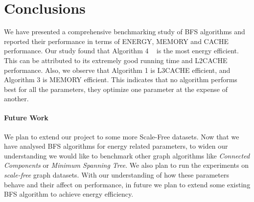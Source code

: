 \section{Conclusions}
\label{conc}

%
%
%

We have presented a comprehensive benchmarking study of BFS algorithms
and reported their performance in terms of ENERGY, MEMORY and CACHE
performance.  Our study found that Algorithm 4 ~\cite{LIGRA-BFS} is the most
energy efficient.  This can be attributed to its extremely good running time
and L2CACHE performance.
\newline
Also, we observe that Algorithm 1 is L3CACHE efficient, and Algorithm 3 is
MEMORY efficient.  This indicates that no algorithm performs best for
all the parameters, they optimize one parameter at the expense of another.


\paragraph{Future Work}
We plan to extend our project to some more Scale-Free datasets.  Now
that we have analysed BFS algorithms for energy related parameters, to
widen our understanding we would like to benchmark other graph
algorithms like \emph{Connected Components} or \emph{Minimum Spanning
Tree}. We also plan to run the experiments on \emph{scale-free} graph
datasets.
\newline
With our understanding of how these parameters behave and their affect
on performance, in future we plan to extend some existing BFS
algorithm to achieve energy efficiency.

%
%
%
%
%
%
%

